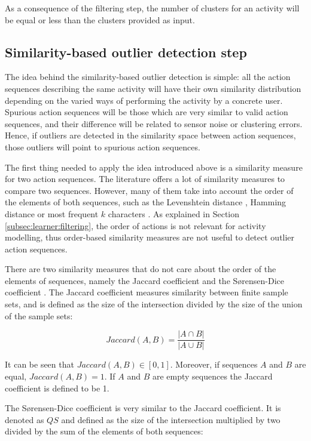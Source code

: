 As a consequence of the filtering step, the number of clusters for an activity will be equal or less than the clusters provided as input.


\subsection{Similarity-based outlier detection step}
\label{subsec:learner:outlier}
The idea behind the similarity-based outlier detection is simple: all the action sequences describing the same activity will have their own similarity distribution depending on the varied ways of performing the activity by a concrete user. Spurious action sequences will be those which are very similar to valid action sequences, and their difference will be related to sensor noise or clustering errors. Hence, if outliers are detected in the similarity space between action sequences, those outliers will point to spurious action sequences. 

The first thing needed to apply the idea introduced above is a similarity measure for two action sequences. The literature offers a lot of similarity measures to compare two sequences. However, many of them take into account the order of the elements of both sequences, such as the Levenshtein distance \cite{Levenshtein1966}, Hamming distance \cite{Hamming1950} or most frequent $k$ characters \cite{Seker2014}. As explained in Section \ref{subsec:learner:filtering}, the order of actions is not relevant for activity modelling, thus order-based similarity measures are not useful to detect outlier action sequences.

There are two similarity measures that do not care about the order of the elements of sequences, namely the Jaccard coefficient \cite{A.K.Jain1988} and the S{\o}rensen-Dice coefficient \cite{Sorensen1948}. The Jaccard coefficient measures similarity between finite sample sets, and is defined as the size of the intersection divided by the size of the union of the sample sets:

\begin{equation}
\label{eq-jaccard}
  Jaccard(A, B) = \frac{|A \cap B|}{|A \cup B|}
 \end{equation}

It can be seen that $Jaccard(A, B) \in [0, 1]$. Moreover, if sequences $A$ and $B$ are equal, $Jaccard(A, B) = 1$. If $A$ and $B$ are empty sequences the Jaccard coefficient is defined to be 1.

The S{\o}rensen-Dice coefficient is very similar to the Jaccard coefficient. It is denoted as $QS$ and defined as the size of the intersection multiplied by two divided by the sum of the elements of both sequences:

